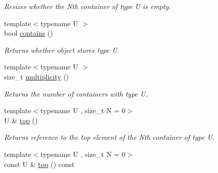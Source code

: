 \begin{DoxyCompactItemize}
\begin{DoxyCompactList}\small\item\em Resizes whether the Nth container of type U is empty. \end{DoxyCompactList}\item 
\hypertarget{classheterogeneous_1_1heterostack_3_01_t_00_01_types_8_8_8_4_a87e5d54f5cfe4cfaad353eb3940dc228}{}{\footnotesize template$<$typename U $>$ }\\bool \hyperlink{classheterogeneous_1_1heterostack_3_01_t_00_01_types_8_8_8_4_a87e5d54f5cfe4cfaad353eb3940dc228}{contains} ()\label{classheterogeneous_1_1heterostack_3_01_t_00_01_types_8_8_8_4_a87e5d54f5cfe4cfaad353eb3940dc228}

\begin{DoxyCompactList}\small\item\em Returns whether object stores type U. \end{DoxyCompactList}\item 
\hypertarget{classheterogeneous_1_1heterostack_3_01_t_00_01_types_8_8_8_4_a15326b06fbda3d8aff09b4f1ca757fbf}{}{\footnotesize template$<$typename U $>$ }\\size\+\_\+t \hyperlink{classheterogeneous_1_1heterostack_3_01_t_00_01_types_8_8_8_4_a15326b06fbda3d8aff09b4f1ca757fbf}{multiplicity} ()\label{classheterogeneous_1_1heterostack_3_01_t_00_01_types_8_8_8_4_a15326b06fbda3d8aff09b4f1ca757fbf}

\begin{DoxyCompactList}\small\item\em Returns the number of containers with type U. \end{DoxyCompactList}\item 
\hypertarget{classheterogeneous_1_1heterostack_3_01_t_00_01_types_8_8_8_4_abcb348e7ca3300ec4c8bb029eaa00c4a}{}{\footnotesize template$<$typename U , size\+\_\+t N = 0$>$ }\\U \& \hyperlink{classheterogeneous_1_1heterostack_3_01_t_00_01_types_8_8_8_4_abcb348e7ca3300ec4c8bb029eaa00c4a}{top} ()\label{classheterogeneous_1_1heterostack_3_01_t_00_01_types_8_8_8_4_abcb348e7ca3300ec4c8bb029eaa00c4a}

\begin{DoxyCompactList}\small\item\em Returns reference to the top element of the Nth container of type U. \end{DoxyCompactList}\item 
\hypertarget{classheterogeneous_1_1heterostack_3_01_t_00_01_types_8_8_8_4_a91a95b058451d0ba62779d53de608727}{}{\footnotesize template$<$typename U , size\+\_\+t N = 0$>$ }\\const U \& \hyperlink{classheterogeneous_1_1heterostack_3_01_t_00_01_types_8_8_8_4_a91a95b058451d0ba62779d53de608727}{top} () const \label{classheterogeneous_1_1heterostack_3_01_t_00_01_types_8_8_8_4_a91a95b058451d0ba62779d53de608727}


\end{DoxyCompactItemize}
